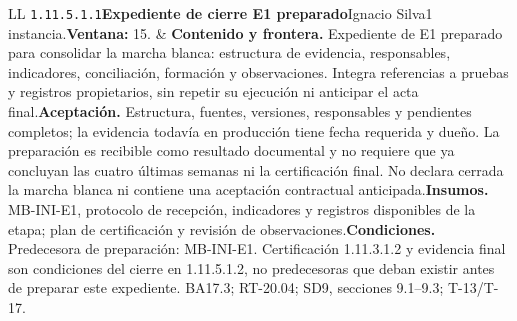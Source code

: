 \begin{longtable}{L{\tabcolsep\relax}L{\tabcolsep\relax}}
\texttt{1.\allowbreak{}11.\allowbreak{}5.\allowbreak{}1.\allowbreak{}1}\newline{}\textbf{Expediente de cierre E1 preparado}\newline{}Ignacio Silva\newline{}1 instancia.\newline{}\textbf{Ventana:} 15. & \textbf{Contenido y frontera.} Expediente de E1 preparado para consolidar la marcha blanca: estructura de evidencia, responsables, indicadores, conciliación, formación y observaciones. Integra referencias a pruebas y registros propietarios, sin repetir su ejecución ni anticipar el acta final.\newline{}\textbf{Aceptación.} Estructura, fuentes, versiones, responsables y pendientes completos; la evidencia todavía en producción tiene fecha requerida y dueño. La preparación es recibible como resultado documental y no requiere que ya concluyan las cuatro últimas semanas ni la certificación final. No declara cerrada la marcha blanca ni contiene una aceptación contractual anticipada.\newline{}\textbf{Insumos.} MB-INI-E1, protocolo de recepción, indicadores y registros disponibles de la etapa; plan de certificación y revisión de observaciones.\newline{}\textbf{Condiciones.} Predecesora de preparación: MB-INI-E1. Certificación 1.11.3.1.2 y evidencia final son condiciones del cierre en 1.11.5.1.2, no predecesoras que deban existir antes de preparar este expediente. BA17.3; RT-20.04; SD9, secciones 9.1--9.3; T-13/T-17.\\\hline

\end{longtable}
